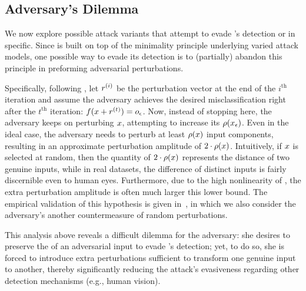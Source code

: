\subsection{Adversary's Dilemma}

We now explore possible attack variants that attempt to evade \system's detection  or \mar in specific. Since \system is built on top of the minimality principle underlying varied attack models, one possible way to evade its detection is to (partially) abandon this principle in preforming adversarial perturbations.

Specifically, following , let $r^{(i)}$ be the perturbation vector at the end of the $i^{\mathrm{th}}$ iteration and assume the adversary achieves the desired misclassification right after the $t^{\mathrm{th}}$ iteration:
$f(x + r^{(t)}) = o_\epsilon$. Now, instead of stopping here, the adversary keeps on perturbing $x$, attempting to increase its \ar $\rho(x_{\epsilon})$. Even in the ideal case, the adversary needs to perturb at least $\rho(x)$ input components, resulting in an approximate perturbation amplitude of $2\cdot\rho(x)$. Intuitively, if $x$ is selected at random, then the quantity of $2\cdot\rho(x)$ represents the distance of two genuine inputs, while in real datasets, the difference of distinct inputs is fairly discernible even to human eyes. Furthermore, due to the high nonlinearity of \dnns, the extra perturbation amplitude is often much larger this lower bound. The empirical validation of this hypothesis is given in~, in which we also consider the adversary's another countermeasure of random perturbations.

This analysis above reveals a difficult dilemma for the adversary: she desires to preserve the \ar of an adversarial input to evade \system's detection; yet, to do so, she is forced to introduce extra perturbations sufficient to transform one genuine input to another, thereby significantly reducing the attack's evasiveness regarding other detection mechanisms (e.g., human vision).


